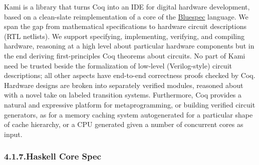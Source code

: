 \documentclass[12pt,twoside]{article}
\begin{document}
\noindent{}Kami is a library that turns Coq into an IDE for digital hardware
development, based on a clean-slate reimplementation of a core of the
\href{http://www.bluespec.com}{Bluespec} language. We span the gap from mathematical specifications to
hardware circuit descriptions (RTL netlists). We support specifying,
implementing, verifying, and compiling hardware, reasoning at a high
level about particular hardware components but in the end deriving
first-principles Coq theorems about circuits. No part of Kami need be
trusted beside the formalization of low-level (Verilog-style) circuit
descriptions; all other aspects have end-to-end correctness proofs
checked by Coq. Hardware designs are broken into separately verified
modules, reasoned about with a novel take on labeled transition
systems. Furthermore, Coq provides a natural and expressive platform
for metaprogramming, or building verified circuit generators, as for a
memory caching system autogenerated for a particular shape of cache
hierarchy, or a CPU generated given a number of concurrent cores as
input.%

\subsubsection{4.1.7.\hspace*{0.5em}Haskell Core Spec}\label{sec-haskell-core-spec}%
\end{document}
